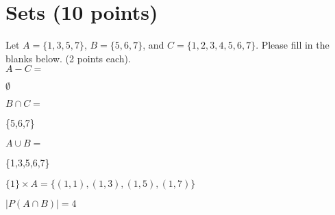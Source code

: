 \documentclass[11pt]{article}
\def\sectionOneA#1{}
\def\sectionOneB#1{}
\def\sectionTwoA#1{#1}
\def\sectionTwoB#1{}
\def\sectionVicsection#1{}
\newcounter{pgpts}
\newcounter{cumpts}
\newcommand{\cnewpage}{\addtocounter{cumpts}{\value{pgpts}}\newpage\setcounter{pgpts}{0}}
\newcommand{\ignore}[1]{}
\begin{document}
\section{Sets (10 points)}\addtocounter{pgpts}{10}

\ignore{
Let \sectionOneA{$A=\{4,6,8\}$}\sectionOneB{$A=\{1,5,9\}$}\sectionTwoA{$A=\{3,6,9\}$}\sectionTwoB{$A=\{4,7,10\}$}
\sectionVicsection{$A=\{1,3,5,7\}$, $B=\{1,2,3,4\}$}
and $C=\{1,2,3,4,5,6,7\}$. 
}
Let \sectionOneA{$A=\{2,4,6,8\}$, $B=\{1,2,3,4\}$,
and $C=\{1,2,3,4,5,6,7\}$}\sectionTwoA{$A=\{1,3,5,7\}$, $B=\{5,6,7\}$,
and $C=\{1,2,3,4,5,6,7\}$}. Please fill in the blanks below. (2 points each).\\[9ex]

$A - C = $
\sectionOneA{\{8\}}
\sectionTwoA{
$\emptyset$
}
\vspace*{2cm}

$B\cap C=$
\sectionOneA{\{1,2,3,4\}}
\sectionTwoA{
\{5,6,7\}
}
\vspace*{2cm}

 $A\cup B =$
 \sectionOneA{\{1,2,3,4,6,8\}}
 \sectionTwoA{
 \{1,3,5,6,7\}}
\vspace*{2cm}

\sectionOneA{$A \times \{1\} = \{(2,1), (4,1), (6,1), (8,1)\}$}
\sectionOneB{$A \times \{1\} = $} %
\sectionTwoA{$\{1\} \times A = \{(1,1),(1,3),(1,5),(1,7)\}$}
\sectionTwoB{$\{1\} \times A = $} %
\sectionVicsection{$|A \times B|=$}

\vspace*{2cm}
 
 $|P({A\cap B})| = 4$\\ 

\cnewpage
\end{document}
